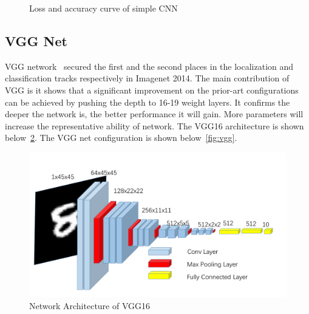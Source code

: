 \documentclass{article}
\begin{document}
\begin{figure}[!htb]
	\centering
{}
\caption{Loss and accuracy curve of simple CNN}
\label{fig:simplecnn-curve}
\end{figure}


\subsection{VGG Net}

VGG network~\cite{simonyan2014very} secured the first and the second places in the localization 
and classification tracks respectively in Imagenet 2014. The main contribution of VGG is it shows that a significant improvement on the prior-art configurations can be achieved by pushing the depth to 16-19 weight layers. It confirms the deeper the network is, the better performance it will gain. More parameters will increase the representative ability of network.  The VGG16 architecture is shown below~\ref{fig:vgg16}. The VGG net configuration is shown below~\ref{fig:vgg}.

\begin{figure}[!htb]
	\centering\includegraphics[width=1.0\textwidth]{fig/vgg16.png}
	\caption{Network Architecture of  VGG16}\label{fig:vgg16}
\end{figure}
\end{document}
